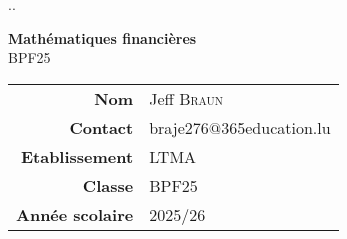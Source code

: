 \documentclass[a4paper, 11pt, oneside, BCOR=0mm, DIV=15]{scrbook} %
\def\classe{BPF25}
\def\season{2025/26}
\begin{document}
\thispagestyle{empty}
{\color{white}.\hfill.}
\vspace{5cm}

\begin{center}
\huge
{\bfseries Mathématiques financières} \\
BPF25
\end{center}

\vfill

\large
\begin{center}
\begin{tabular}{r|l}
\textbf{Nom}
 & Jeff {\scshape Braun} \\
\textbf{Contact}
 & {braje276$@$365education.lu} \\
\textbf{Etablissement}
 & {\scshape LTMA} \\
\textbf{Classe}
 & {\scshape \classe} \\
\textbf{Année scolaire}
 & {\scshape \season}
\end{tabular}
\end{center}


\clearpage




%
%
%
%
%
\end{document}
